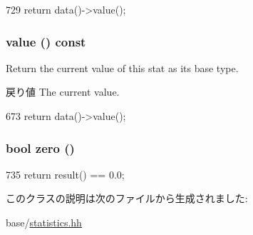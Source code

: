 \begin{DoxyCode}
729 { return data()->value(); }
\end{DoxyCode}
\hypertarget{classStats_1_1ScalarBase_aa9e486cb7eb0ad44f5f89923594b68a4}{
\subsubsection[{value}]{ value () const}}
\label{classStats_1_1ScalarBase_aa9e486cb7eb0ad44f5f89923594b68a4}
Return the current value of this stat as its base type. \begin{DoxyReturn}{戻り値}
The current value. 
\end{DoxyReturn}



\begin{DoxyCode}
673 { return data()->value(); }
\end{DoxyCode}
\hypertarget{classStats_1_1ScalarBase_a80f684bcfd8af096435375afa29d6da2}{
\subsubsection[{zero}]{\setlength{\rightskip}{0pt plus 5cm}bool zero ()}}
\label{classStats_1_1ScalarBase_a80f684bcfd8af096435375afa29d6da2}



\begin{DoxyCode}
735 { return result() == 0.0; }
\end{DoxyCode}


このクラスの説明は次のファイルから生成されました:\begin{DoxyCompactItemize}
\item 
base/\hyperlink{statistics_8hh}{statistics.hh}\end{DoxyCompactItemize}
